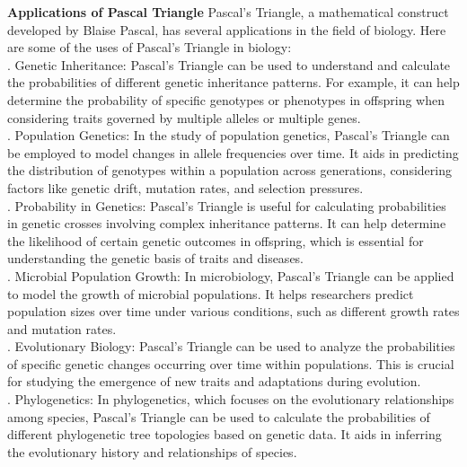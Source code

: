 
\vspace{1cm}
\noindent \textbf{Applications of Pascal Triangle}
Pascal's Triangle, a mathematical construct developed by Blaise Pascal, has several applications in the field of biology. Here are some of the uses of Pascal's Triangle in biology:  \\

. Genetic Inheritance: Pascal's Triangle can be used to understand and calculate the probabilities of different genetic inheritance patterns. For example, it can help determine the probability of specific genotypes or phenotypes in offspring when considering traits governed by multiple alleles or multiple genes. \\

. Population Genetics: In the study of population genetics, Pascal's Triangle can be employed to model changes in allele frequencies over time. It aids in predicting the distribution of genotypes within a population across generations, considering factors like genetic drift, mutation rates, and selection pressures. \\

. Probability in Genetics: Pascal's Triangle is useful for calculating probabilities in genetic crosses involving complex inheritance patterns. It can help determine the likelihood of certain genetic outcomes in offspring, which is essential for understanding the genetic basis of traits and diseases. \\

. Microbial Population Growth: In microbiology, Pascal's Triangle can be applied to model the growth of microbial populations. It helps researchers predict population sizes over time under various conditions, such as different growth rates and mutation rates. \\

. Evolutionary Biology: Pascal's Triangle can be used to analyze the probabilities of specific genetic changes occurring over time within populations. This is crucial for studying the emergence of new traits and adaptations during evolution. \\

. Phylogenetics: In phylogenetics, which focuses on the evolutionary relationships among species, Pascal's Triangle can be used to calculate the probabilities of different phylogenetic tree topologies based on genetic data. It aids in inferring the evolutionary history and relationships of species. \\

